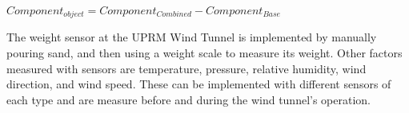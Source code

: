 	$Component_{object} = Component_{Combined} - Component_{Base}$


	The weight sensor at the UPRM Wind Tunnel is implemented by manually pouring sand, and then using a weight scale to measure its weight. Other factors measured with sensors are temperature, pressure, relative humidity, wind direction, and wind speed. These can be implemented with different sensors of each type and are measure before and during the wind tunnel's operation.


		

		